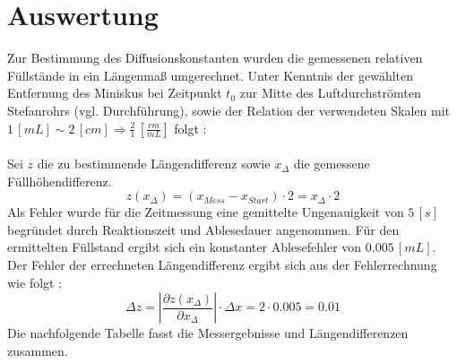 %
%
\setlength\abovedisplayshortskip{20pt}
\setlength\belowdisplayshortskip{20pt}
\setlength\abovedisplayskip{20pt}
\setlength\belowdisplayskip{20pt}
\section {Auswertung}
Zur Bestimmung des Diffusionskonstanten wurden die gemessenen relativen Füllstände in ein Längenmaß umgerechnet. Unter Kenntnis der gewählten Entfernung des Miniskus bei Zeitpunkt $t_0$ zur Mitte des Luftdurchströmten Stefanrohrs (vgl. Durchführung), sowie der Relation der verwendeten Skalen mit $1\,[\si{mL}] \sim 2\,[\si{cm}] \Rightarrow \frac{2}{1}\,\left[ \si{\frac{cm}{mL}}\right] $ folgt :\\
\\
Sei $z$ die zu bestimmende Längendifferenz sowie $x_{\Delta}$ die gemessene Füllhöhendifferenz.
\begin{equation}
z(x_{\Delta})= (x_{Mess}-x_{Start}) \cdot 2= x_{\Delta} \cdot 2
\end{equation}
Als Fehler wurde für die Zeitmessung eine gemittelte Ungenauigkeit von $5\,[\si{s}]$ begründet durch Reaktionszeit und Ablesedauer angenommen. Für den ermittelten Füllstand ergibt sich ein konstanter Ablesefehler von $0.005 \,[\si{mL}]$. Der Fehler der errechneten Längendifferenz ergibt sich aus der Fehlerrechnung wie folgt : 
\begin{equation}
	\Delta z = \left|\frac{\partial z(x_{\Delta})}{\partial x_{\Delta}}\right| \cdot \Delta x = 2 \cdot 0.005 = 0.01
\end{equation}
Die nachfolgende Tabelle fasst die Messergebnisse und Längendifferenzen zusammen.
